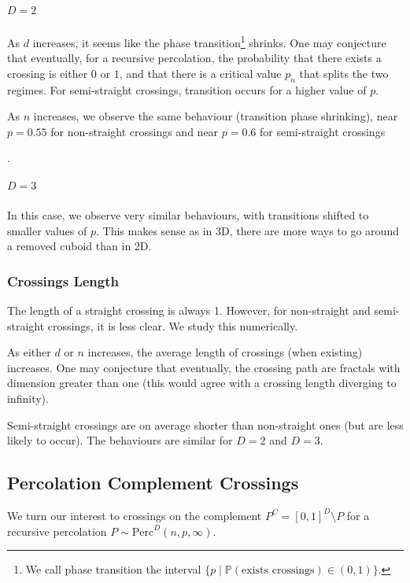 \subparagraph{$D=2$}
As $d$ increases, it seems like the phase transition\footnote{We call phase transition the interval $\{ p \mid \mathbb{P}(\text{exists crossings}) \in (0,1) \}$.} shrinks.
One may conjecture that eventually, for a recursive percolation, the probability that there exists a crossing is either $0$ or $1$, and that there is a critical value $p_n$ that splits the two regimes.
For semi-straight crossings, transition occurs for a higher value of $p$\footnotemark.

As $n$ increases, we observe the same behaviour (transition phase shrinking), near $p=0.55$ for non-straight crossings and near $p=0.6$ for semi-straight crossings\addtocounter{footnote}{-1}\footnotemark.

\subparagraph{$D=3$}
In this case, we observe very similar behaviours, with transitions shifted to smaller values of $p$.
This makes sense as in 3D, there are more ways to go around a removed cuboid than in 2D.

\subsubsection{Crossings Length}
The length of a straight crossing is always 1.
However, for non-straight and semi-straight crossings, it is less clear.
We study this numerically.

As either $d$ or $n$ increases, the average  length of crossings (when existing) increases.
One may conjecture that eventually, the crossing path are fractals with dimension greater than one (this would agree with a crossing length diverging to infinity).

Semi-straight crossings are on average shorter than non-straight ones (but are less likely to occur).
The behaviours are similar for $D=2$ and $D=3$.


\subsection{Percolation Complement Crossings}
We turn our interest to crossings on the complement $P^C = \left[ 0,1 \right]^D \setminus P$ for a recursive percolation $P \sim \text{Perc}^D(n,p,\infty)$.


